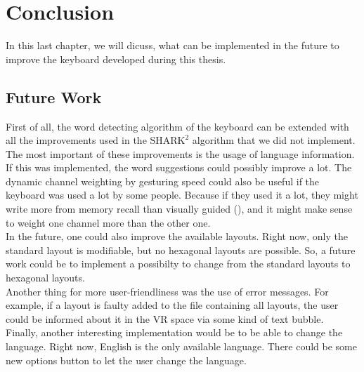 \chapter{Conclusion}

In this last chapter, we will dicuss, what can be implemented in the future to improve the keyboard developed during this thesis.

\section{Future Work}
First of all, the word detecting algorithm of the keyboard can be extended with all the improvements used in the $\text{SHARK}^2$ algorithm that we did not implement. The most important of these improvements is the usage of language information. If this was implemented, the word suggestions could possibly improve a lot. The dynamic channel weighting by gesturing speed could also be useful if the keyboard was used a lot by some people. Because if they used it a lot, they might write more from memory recall than visually guided (), and it might make sense to weight one channel more than the other one.\\
In the future, one could also improve the available layouts. Right now, only the standard layout is modifiable, but no hexagonal layouts are possible. So, a future work could be to implement a possibilty to change from the standard layouts to hexagonal layouts.\\
Another thing for more user-friendliness was the use of error messages. For example, if a layout is faulty added to the file containing all layouts, the user could be informed about it in the VR space via some kind of text bubble.\\
Finally, another interesting implementation would be to be able to change the language. Right now, English is the only available language. There could be some new options button to let the user change the language.